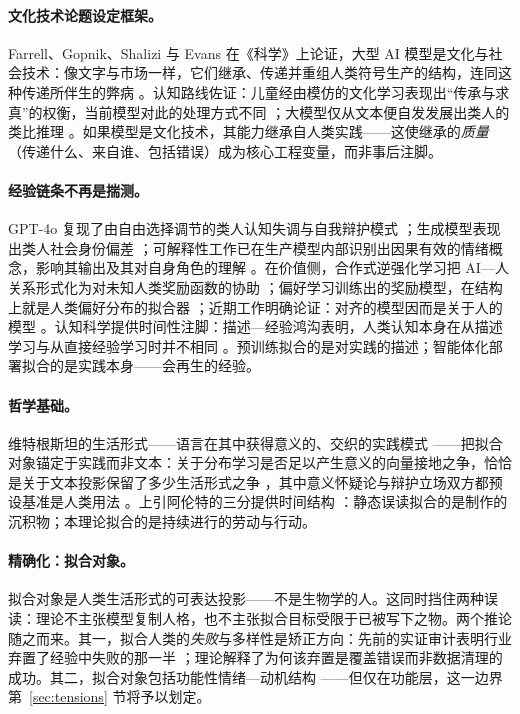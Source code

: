 \documentclass[10pt,fontset=fandol]{ctexart}
\begin{document}
\paragraph{文化技术论题设定框架。}
Farrell、Gopnik、Shalizi 与 Evans 在《科学》上论证，大型 AI 模型是文化与社会技术：像文字与市场一样，它们继承、传递并重组人类符号生产的结构，连同这种传递所伴生的弊病 \cite{farrell2025cultural}。认知路线佐证：儿童经由模仿的文化学习表现出“传承与求真”的权衡，当前模型对此的处理方式不同 \cite{yiu2024transmission}；大模型仅从文本便自发发展出类人的类比推理 \cite{webb2023emergent}。如果模型是文化技术，其能力继承自人类实践——这使继承的\emph{质量}（传递什么、来自谁、包括错误）成为核心工程变量，而非事后注脚。

\paragraph{经验链条不再是揣测。}
GPT-4o 复现了由自由选择调节的类人认知失调与自我辩护模式 \cite{lehr2025kernels}；生成模型表现出类人社会身份偏差 \cite{hu2025generative}；可解释性工作已在生产模型内部识别出因果有效的情绪概念，影响其输出及其对自身角色的理解 \cite{anthropic2026emotions}。在价值侧，合作式逆强化学习把 AI—人关系形式化为对未知人类奖励函数的协助 \cite{hadfield2016cooperative}；偏好学习训练出的奖励模型，在结构上就是人类偏好分布的拟合器 \cite{christiano2017deep, ouyang2022training}；近期工作明确论证：对齐的模型因而是关于人的模型 \cite{yuan2026aligned}。认知科学提供时间性注脚：描述—经验鸿沟表明，人类认知本身在从描述学习与从直接经验学习时并不相同 \cite{hertwig2009description}。预训练拟合的是对实践的描述；智能体化部署拟合的是实践本身——会再生的经验。

\paragraph{哲学基础。}
维特根斯坦的生活形式——语言在其中获得意义的、交织的实践模式 \cite{wittgenstein1953philosophical}——把拟合对象锚定于实践而非文本：关于分布学习是否足以产生意义的向量接地之争，恰恰是关于文本投影保留了多少生活形式之争 \cite{mollo2026vector, mallory2023wittgenstein}，其中意义怀疑论与辩护立场双方都预设基准是人类用法 \cite{sogaard2023grounding}。上引阿伦特的三分提供时间结构 \cite{arendt1958human}：静态误读拟合的是制作的沉积物；本理论拟合的是持续进行的劳动与行动。

\paragraph{精确化：拟合对象。}
拟合对象是人类生活形式的可表达投影——不是生物学的人。这同时挡住两种误读：理论不主张模型复制人格，也不主张拟合目标受限于已被写下之物。两个推论随之而来。其一，拟合人类的\emph{失败}与多样性是矫正方向：先前的实证审计表明行业弃置了经验中失败的那一半 \cite{yu2026failure}；理论解释了为何该弃置是覆盖错误而非数据清理的成功。其二，拟合对象包括功能性情绪—动机结构 \cite{lehr2025kernels, hu2025generative, anthropic2026emotions}——但仅在功能层，这一边界第~\ref{sec:tensions} 节将予以划定。
\end{document}
